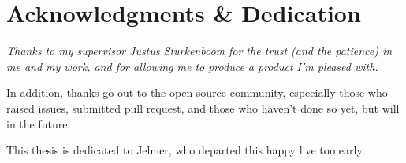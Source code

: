 
\begingroup
  \let\clearpage\relax
  \let\cleardoublepage\relax
  \chapter*{Acknowledgments \& Dedication}

  \itshape
  Thanks to my supervisor Justus Sturkenboom for the trust (and the patience)
    in me and my work, and for allowing me to produce a product I'm pleased
    with.

  \medskip
  \noindent In addition, thanks go out to the open source community,
    especially those who raised issues, submitted pull request, and those
    who haven't done so yet, but will in the future.

  \medskip
  \noindent This thesis is dedicated to Jelmer, who departed this happy live
    too early.
\endgroup
